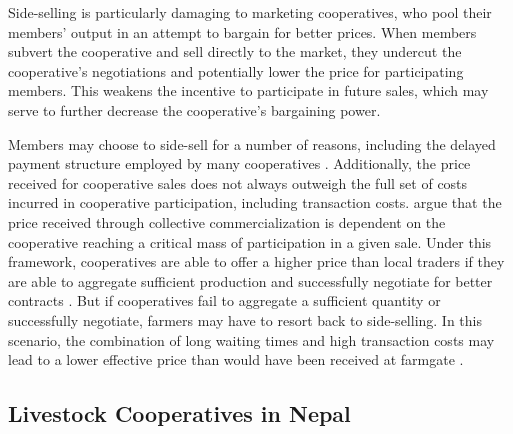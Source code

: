 \documentclass[11pt]{article}
\begin{document}
Side-selling is particularly damaging to marketing cooperatives, who pool their members' output in an attempt to bargain for better prices. When members subvert the cooperative and sell directly to the market, they undercut the cooperative's negotiations and potentially lower the price for participating members. This weakens the incentive to participate in future sales, which may serve to further decrease the cooperative's bargaining power. 

Members may choose to side-sell for a number of reasons, including the delayed payment structure employed by many cooperatives \citep{markelova_collective_2010,mujawamariya_exploring_2013,shumeta_two-step_2018}. Additionally, the price received for cooperative sales does not always outweigh the full set of costs incurred in cooperative participation, including transaction costs. \citet{aflagah_cheap_2019} argue that the price received through collective commercialization is dependent on the cooperative reaching a critical mass of participation in a given sale. Under this framework, cooperatives are able to offer a higher price than local traders if they are able to aggregate sufficient production and successfully negotiate for better contracts \citep{aflagah_cheap_2019}. But if cooperatives fail to aggregate a sufficient quantity or successfully negotiate, farmers may have to resort back to side-selling. In this scenario, the combination of long waiting times and high transaction costs may lead to a lower effective price than would have been received at farmgate \citep{aflagah_cheap_2019}.


\subsection{Livestock Cooperatives in Nepal}
\end{document}
